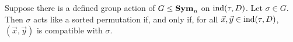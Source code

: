 \documentclass[../paper.tex]{subfiles}
\begin{document}



\begin{lem}
  Suppose there is a defined group action of $G \leq \text{\textbf{Sym}}_n$ on $\text{\upshape ind}(\tau, D)$.
  Let $\sigma \in G$. Then $\sigma$ acts like a sorted permutation if, and only
  if, for all $\vec{x}, \vec{y} \in \text{\upshape ind}(\tau, D)$, $(\vec{x}, \vec{y})$ is
  compatible with $\sigma$.
  \label{lem:isostab-compatible}
\end{lem}
\end{document}
